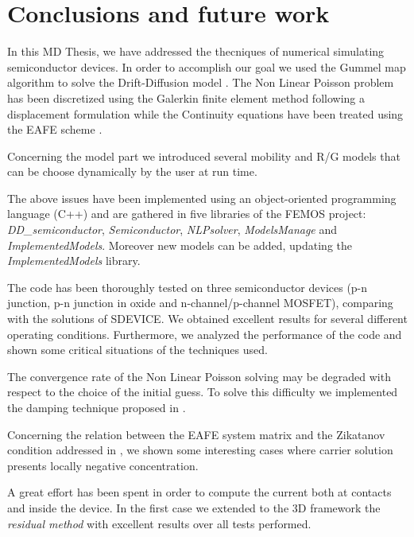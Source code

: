 \chapter{Conclusions and future work}


In this MD Thesis, we have addressed the thecniques of numerical simulating semiconductor devices. 
In order to accomplish our goal we used the Gummel map algorithm \cite{GummelMap} to solve the Drift-Diffusion model  \cite{Jackson:ElettroClassica}. The Non Linear Poisson problem has been discretized using the Galerkin finite element method \cite{quarteroni:NumApprox} following a displacement formulation while the Continuity equations have been treated using the EAFE scheme \cite{Zikatanov:EAFE1}. 

Concerning the model part we introduced several mobility and R/G models that can be choose dynamically by the user at run time.

The above issues have been implemented using an object-oriented programming language (C++) and are gathered in five libraries of the FEMOS project: \textit{DD\_semiconductor}, \textit{Semiconductor}, \textit{NLPsolver}, \textit{ModelsManage} and \textit{ImplementedModels}. Moreover new models can be added, updating the \textit{ImplementedModels} library.

The code has been thoroughly tested on three semiconductor devices (p-n junction, p-n junction in oxide and n-channel/p-channel MOSFET), comparing with the solutions of SDEVICE. We obtained excellent results for several different operating conditions. Furthermore, we analyzed the performance of the code and shown some critical situations of the techniques used.

The convergence rate of the Non Linear Poisson solving may be degraded with respect to the choice of the initial guess. To solve this difficulty we implemented the damping technique proposed in \cite{DefulhardDamp}.

Concerning the relation between the EAFE system matrix and the Zikatanov condition addressed in  \cite{Zikatanov:EAFE1},  we shown some interesting cases where carrier solution presents locally negative concentration.

\vspace{1cm}

A great effort has been spent in order to compute the current both at contacts and inside the device. In the first case we extended to the 3D framework the \textit{residual method} \cite{ContactCurrentRM} with excellent results over all tests performed. 

